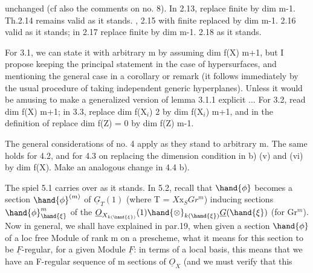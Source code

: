 
unchanged (cf also  the comments on no. 8). In 2.13, replace finite
by dim \hand{$\leqslant$} m-1. Th.2.14 remains valid as it stands. , 2.15 with
finite replaced by dim \hand{$\leqslant$} m-1. 2.16 valid as it stands; in
 2.17 replace finite by dim \hand{$\leqslant$} m-1. 2.18 as it stands.

For 3.1, we can state it with arbitrary m by assuming
dim f(X) \hand{$\geqslant$} m+1, but I propose keeping the principal statement in
the case of hypersurfaces, and mentioning the general case in a corollary
or remark (it follows immediately by the usual procedure of
taking independent generic hyperplanes). Unless it would be
amusing to make a generalized version of lemma 3.1.1 explicit ...
For 3.2, read dim f(X)\hand{$\geqslant$} m+1; in 3.3, replace dim f(X$_i$) \hand{$\geqslant$} 2
by dim f(X$_i$)\hand{$\geqslant$} m+1, and in the definition of  replace dim f(Z) = 0
by dim f(Z) \hand{$\leqslant$} m-1.

The general considerations of no. 4 apply as they stand
to arbitrary m. The same holds for 4.2, and for 4.3 on replacing
the dimension condition in b) (v) and (vi) by
dim f(X). Make an analogous change in 4.4 b).

The spiel 5.1 carries over as it stands. In 5.2, recall
that $\hand{\phi}$ becomes a section $\hand{\phi}^{(m)}$ of $\underline{G}_T(1)$ (where T 
 = $X\mathrm{x}_S Gr^m$)  inducing sections
$\hand{\phi}^m_{\hand{\xi}}$ of the   $\underline{O}_{X_{k(\hand{\xi})}}(1)\hand{\otimes}_{k(\hand{\xi})}\underline{G}(\hand{\xi})$ (for \hand{$\xi \in$} Gr$^m$). Now
in general, we shall have explained in par.19, when given a
 section $\hand{\phi}$ of a loc free Module of rank m on a prescheme, what
it means for this section to be $\underline{F}$-regular, for a given Module
$\underline{F}$: in terms of a local basis, this means that we have an
F-regular sequence of m sections of $\underline{O}_X$ (and we must verify that this

